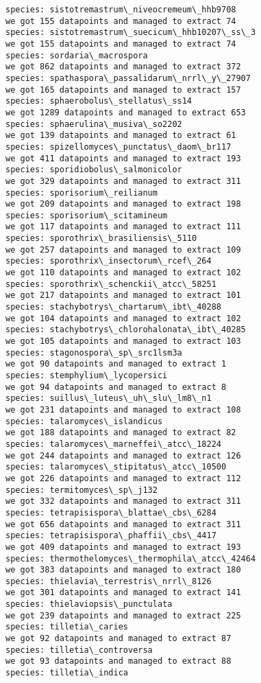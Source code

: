 \documentclass[11pt]{article}
\begin{document}
\begin{Verbatim}[commandchars=\\\{\}]
species: sistotremastrum\_niveocremeum\_hhb9708
we got 155 datapoints and managed to extract 74
species: sistotremastrum\_suecicum\_hhb10207\_ss\_3
we got 155 datapoints and managed to extract 74
species: sordaria\_macrospora
we got 862 datapoints and managed to extract 372
species: spathaspora\_passalidarum\_nrrl\_y\_27907
we got 165 datapoints and managed to extract 157
species: sphaerobolus\_stellatus\_ss14
we got 1289 datapoints and managed to extract 653
species: sphaerulina\_musiva\_so2202
we got 139 datapoints and managed to extract 61
species: spizellomyces\_punctatus\_daom\_br117
we got 411 datapoints and managed to extract 193
species: sporidiobolus\_salmonicolor
we got 329 datapoints and managed to extract 311
species: sporisorium\_reilianum
we got 209 datapoints and managed to extract 198
species: sporisorium\_scitamineum
we got 117 datapoints and managed to extract 111
species: sporothrix\_brasiliensis\_5110
we got 257 datapoints and managed to extract 109
species: sporothrix\_insectorum\_rcef\_264
we got 110 datapoints and managed to extract 102
species: sporothrix\_schenckii\_atcc\_58251
we got 217 datapoints and managed to extract 101
species: stachybotrys\_chartarum\_ibt\_40288
we got 104 datapoints and managed to extract 102
species: stachybotrys\_chlorohalonata\_ibt\_40285
we got 105 datapoints and managed to extract 103
species: stagonospora\_sp\_src1lsm3a
we got 90 datapoints and managed to extract 1
species: stemphylium\_lycopersici
we got 94 datapoints and managed to extract 8
species: suillus\_luteus\_uh\_slu\_lm8\_n1
we got 231 datapoints and managed to extract 108
species: talaromyces\_islandicus
we got 188 datapoints and managed to extract 82
species: talaromyces\_marneffei\_atcc\_18224
we got 244 datapoints and managed to extract 126
species: talaromyces\_stipitatus\_atcc\_10500
we got 226 datapoints and managed to extract 112
species: termitomyces\_sp\_j132
we got 332 datapoints and managed to extract 311
species: tetrapisispora\_blattae\_cbs\_6284
we got 656 datapoints and managed to extract 311
species: tetrapisispora\_phaffii\_cbs\_4417
we got 409 datapoints and managed to extract 193
species: thermothelomyces\_thermophila\_atcc\_42464
we got 383 datapoints and managed to extract 180
species: thielavia\_terrestris\_nrrl\_8126
we got 301 datapoints and managed to extract 141
species: thielaviopsis\_punctulata
we got 239 datapoints and managed to extract 225
species: tilletia\_caries
we got 92 datapoints and managed to extract 87
species: tilletia\_controversa
we got 93 datapoints and managed to extract 88
species: tilletia\_indica

\end{Verbatim}
\end{document}

